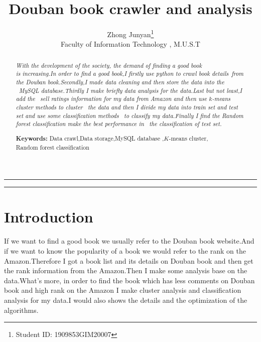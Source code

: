 \documentclass[12pt, a4paper]{article}
\begin{document}
    \title{\bf Douban book crawler and analysis}
    \author{
        {Zhong Junyan\thanks{Student ID: 1909853GIM20007}}\\
        Faculty of Information Technology , M.U.S.T\\
    }
    \date{}
    \maketitle

    \hrule

    \begin{abstract}
        \noindent




        {\sl With the development of the society, the demand of finding a good book \\
        is increasing.In order to find a good book,I firstly use python to crawl book details\
        from the Douban book.Secondly,I made data cleaning and then store the data into the \
        MySQL database.Thirdly I make briefly data analysis for the data.Last but not least,I add the \
        sell ratings information for my data from Amazon and then use $k$-means cluster methods to cluster \ 
        the data and then I divide my data into train set and test set and use some classification methods \ 
        to classify my data.Finally I find the Random forest classification make the best performance in \ 
        the classification of test set.}



















        {\bf Keywords:} Data crawl,Data storage,MySQL database ,$K$-means cluster, \\ Random forest classification
    \end{abstract}

    \hrule

    
    \section{Introduction}
            
        If we want to find a good book we usually refer to the 
        Douban book website.And if we want to know the popularity 
        of a book we would refer to the rank on the Amazon.Therefore I 
        got a book list and its details on Douban book and then get the 
        rank information from the Amazon.Then I make some analysis base on 
        the data.What’s more, in order to find the book which has less 
        comments on Douban book and high rank on the Amazon I make  
        cluster analysis and classification analysis for my data.I would 
        also shows the details and the optimization of the algorithms.\\
\end{document}
